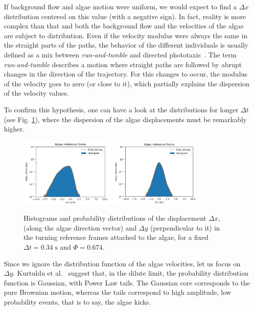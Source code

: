 If background flow and algae motion were uniform, we would expect to find a $\Delta x$ distribution centered on this value (with a negative sign). In fact, reality is more complex than that and both the background flow and the velocities of the algae are subject to distribution. Even if the velocity modulus were always the same in the straight parts of the paths, the behavior of the different individuals is usually defined as a mix between \textit{run-and-tumble} and directed phototaxis~\cite{Polin}. The term \textit{run-and-tumble} describes a motion where straight paths are followed by abrupt changes in the direction of the trajectory. For this changes to occur, the modulus of the velocity goes to zero (or close to it), which partially explains the dispersion of the velocity values.

To confirm this hypothesis, one can have a look at the distributions for longer $\Delta t$ (see Fig. \ref{prob_dist_e3_longer}), where the dispersion of the algae displacements must be remarkably higher.
 
\begin{figure}[H]
	\centering
	\includegraphics[width=0.42\textwidth]{archivos/pdf_x_e3_longer.png}
	\includegraphics[width=0.4\textwidth]{archivos/pdf_y_e3_longer.png}
	\caption{Histograms and probability distributions of the displacement $\Delta x$, (along the algae direction vector) and $\Delta y$ (perpendicular to it) in the turning reference frames attached to the algae, for a fixed $\Delta t = 0.34 \; \textrm{s}$ and $\Phi = 0.674$.}
	\label{prob_dist_e3_longer}
\end{figure}

Since we ignore the distribution function of the algae velocities, let us focus on $\Delta y$. Kurtuldu et al.~\cite{Kurtuldu2011} suggest that, in the dilute limit, the probability distribution function is Gaussian, with Power Law tails. The Gaussian core corresponds to the pure Brownian motion, whereas the tails correspond to high amplitude, low probability events, that is to say, the algae kicks. 

